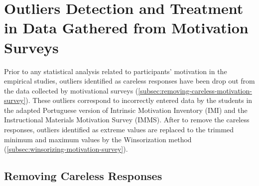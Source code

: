 
\chapter{Outliers Detection and Treatment in Data Gathered from Motivation Surveys}
\label{appendix:outliers}




Prior to any statistical analysis related to participants' motivation in the empirical studies, outliers identified as careless responses have been drop out from the data collected by motivational surveys (\autoref{subsec:removing-careless-motivation-survey}). These outliers correspond to incorrectly entered data by the students in the adapted Portuguese version of Intrinsic Motivation Inventory (IMI) and the Instructional Materials Motivation Survey (IMMS). After to remove the careless responses, outliers identified as extreme values are replaced to the trimmed minimum and maximum values by the Winsorization method (\autoref{subsec:winsorizing-motivation-survey}).

\section{Removing Careless Responses}
\label{subsec:removing-careless-motivation-survey}

